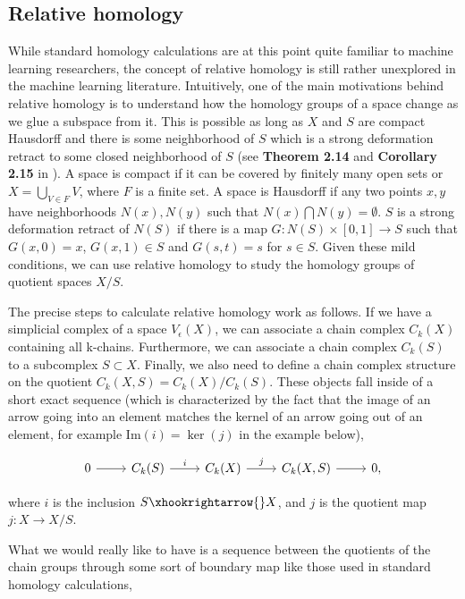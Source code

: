 \documentclass[10pt]{article} %
\theoremstyle{plain}
\theoremstyle{definition}
\theoremstyle{remark}
\begin{document}
\subsection{Relative homology}
While standard homology calculations are at this point quite familiar to machine learning researchers, the concept of relative homology is still rather unexplored in the machine learning literature. Intuitively, one of the main motivations behind relative homology is to understand how the homology groups of a space change as we glue a subspace from it. This is possible as long as $X$ and $S$ are compact Hausdorff and there is some neighborhood of $S$ which is a strong deformation retract to some closed neighborhood of $S$ (see \textbf{Theorem 2.14} and \textbf{Corollary 2.15} in \citet{vick2012homology}). {A space is compact if it can be covered by finitely many open sets or $X = \bigcup_{V\in F} V$, where $F$ is a finite set. A space is Hausdorff if any two points $x,y$ have neighborhoods $N(x),N(y)$ such that $N(x)\bigcap N(y) = \emptyset$. $S$ is a strong deformation retract of $N(S)$ if there is a map $G:N(S)\times [0,1] \to S$ such that $G(x,0)=x$, $G(x,1)\in S$ and $G(s,t) = s$ for $s\in S$}. Given these mild conditions, we can use relative homology to study the homology groups of quotient spaces $X/S$. 

The precise steps to calculate relative homology work as follows. If we have a simplicial complex of a space $V_\epsilon(X)$, we can associate a chain complex $C_k(X)$ containing all k-chains. Furthermore, we can associate a chain complex $C_k(S)$ to a subcomplex $S \subset X$. Finally, we also need to define a chain complex structure on the quotient $C_k(X,S) = C_k(X)/C_k(S)$. These objects fall inside of a short exact sequence {(which is characterized by the fact that the image of an arrow going into an element matches the kernel of an arrow going out of an element, for example $\text{Im}(i) = \ker (j)$ in the example below)},

\begin{equation*}
    \begin{tikzcd}
        0 \arrow[r, ""] & C_k(S) \arrow[r, "i"] & C_k(X) \arrow[r,"j"] & C_k(X,S) \arrow[r,""] & 0,
    \end{tikzcd}
\end{equation*}

where $i$ is the inclusion $S \xhookrightarrow{} X$, and $j$ is the quotient map $j: X \to X/S$.

What we would really like to have is a sequence between the quotients of the chain groups through some sort of boundary map like those used in standard homology calculations,
\end{document}
